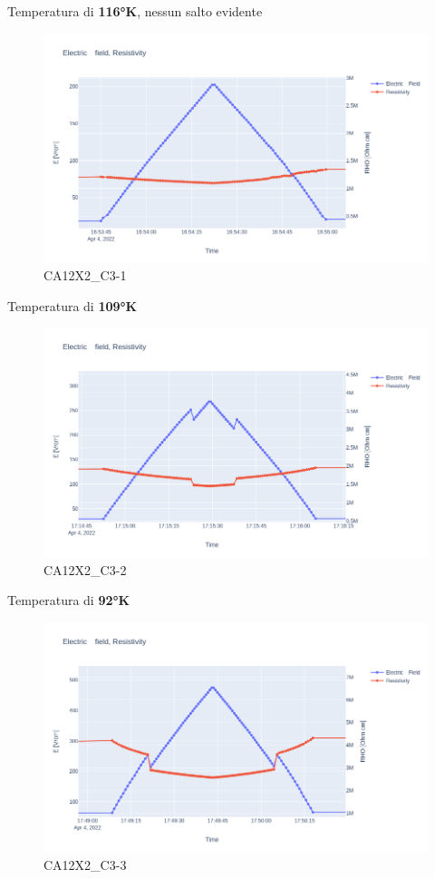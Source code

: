 \documentclass[11pt]{article}
\begin{document}
Temperatura di \textbf{116°K}, nessun salto evidente

\begin{figure}
\centering
\includegraphics{CA12X2_C3-116.png}
\caption{CA12X2\_C3-1}
\end{figure}

Temperatura di \textbf{109°K}

\begin{figure}
\centering
\includegraphics{CA12X2_C3-109.png}
\caption{CA12X2\_C3-2}
\end{figure}

Temperatura di \textbf{92°K}

\begin{figure}
\centering
\includegraphics{CA12X2_C3-92.png}
\caption{CA12X2\_C3-3}
\end{figure}
\end{document}
